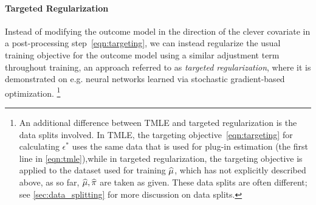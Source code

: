 \paragraph{Targeted Regularization~\cite{chernozhukov2022riesznet,shi2019adapting}}
Instead of modifying the outcome model in the direction of the clever covariate in a post-processing step~\eqref{eqn:targeting},
we can instead regularize the usual training objective for the outcome model using a similar adjustment term throughout training, an approach referred to as \emph{targeted regularization}, %
where it is demonstrated on e.g. neural networks learned via stochastic gradient-based optimization. %
\ifdefined\msom\else\footnote{An additional difference between TMLE and targeted regularization is the data splits involved. In TMLE, the targeting objective~\eqref{eqn:targeting} for calculating $\epsilon^*$ uses the same data that is used for plug-in estimation (the first line in \eqref{eqn:tmle}),while in targeted regularization, the targeting objective is applied to the dataset used for training $\widehat{\mu}$, which has not explicitly described above, as so far, $\widehat{\mu}, \widehat{\pi}$ are taken as given. These data splits are often different; see \cref{sec:data_splitting} for more discussion on data splits.}\fi %
